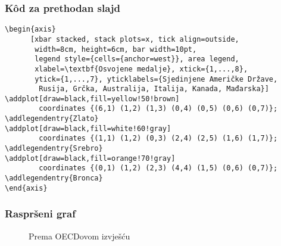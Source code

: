 \documentclass{beamer}
\begin{document}
\begin{frame}[fragile]
\frametitle{K\^od za prethodan slajd}
\small
\begin{lstlisting}
\begin{axis}
      [xbar stacked, stack plots=x, tick align=outside,
       width=8cm, height=6cm, bar width=10pt,
       legend style={cells={anchor=west}}, area legend,
       xlabel=\textbf{Osvojene medalje}, xtick={1,...,8},
       ytick={1,...,7}, yticklabels={Sjedinjene Američke Države, 
        Rusija, Grčka, Australija, Italija, Kanada, Mađarska}]
\addplot[draw=black,fill=yellow!50!brown]
        coordinates {(6,1) (1,2) (1,3) (0,4) (0,5) (0,6) (0,7)};
\addlegendentry{Zlato}
\addplot[draw=black,fill=white!60!gray]
        coordinates {(1,1) (1,2) (0,3) (2,4) (2,5) (1,6) (1,7)};
\addlegendentry{Srebro}
\addplot[draw=black,fill=orange!70!gray]
        coordinates {(0,1) (1,2) (2,3) (4,4) (1,5) (0,6) (0,7)};
\addlegendentry{Bronca}
\end{axis}       
\end{lstlisting}
\end{frame}

\begin{frame}
\frametitle{Raspršeni graf}
\begin{figure}
\centering  
{}
\caption{Prema OECDovom izvješću}
\end{figure}
\end{frame}
\end{document}
